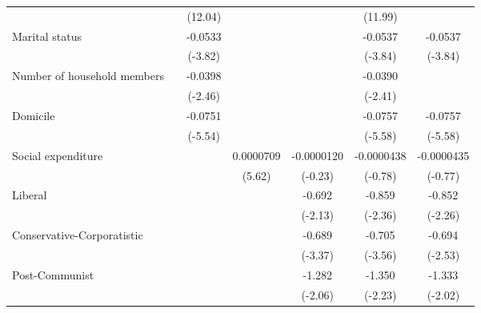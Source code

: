 {\begin{tabular}{l*{6}{c}}
                &                  &  (12.04)         &                  &                  &  (11.99)         &                  \\
Marital status  &                  &  -0.0533\sym{***}&                  &                  &  -0.0537\sym{***}&  -0.0537\sym{***}\\
                &                  &  (-3.82)         &                  &                  &  (-3.84)         &  (-3.84)         \\
Number of household members&                  &  -0.0398\sym{*}  &                  &                  &  -0.0390\sym{*}  &                  \\
                &                  &  (-2.46)         &                  &                  &  (-2.41)         &                  \\
Domicile        &                  &  -0.0751\sym{***}&                  &                  &  -0.0757\sym{***}&  -0.0757\sym{***}\\
                &                  &  (-5.54)         &                  &                  &  (-5.58)         &  (-5.58)         \\
Social expenditure&                  &                  &0.0000709\sym{***}&-0.0000120         &-0.0000438         &-0.0000435         \\
                &                  &                  &   (5.62)         &  (-0.23)         &  (-0.78)         &  (-0.77)         \\
Liberal         &                  &                  &                  &   -0.692\sym{*}  &   -0.859\sym{*}  &   -0.852\sym{*}  \\
                &                  &                  &                  &  (-2.13)         &  (-2.36)         &  (-2.26)         \\
Conservative-Corporatistic&                  &                  &                  &   -0.689\sym{***}&   -0.705\sym{***}&   -0.694\sym{*}  \\
                &                  &                  &                  &  (-3.37)         &  (-3.56)         &  (-2.53)         \\
Post-Communist  &                  &                  &                  &   -1.282\sym{*}  &   -1.350\sym{*}  &   -1.333\sym{*}  \\
                &                  &                  &                  &  (-2.06)         &  (-2.23)         &  (-2.02)         \\

\end{tabular}}
